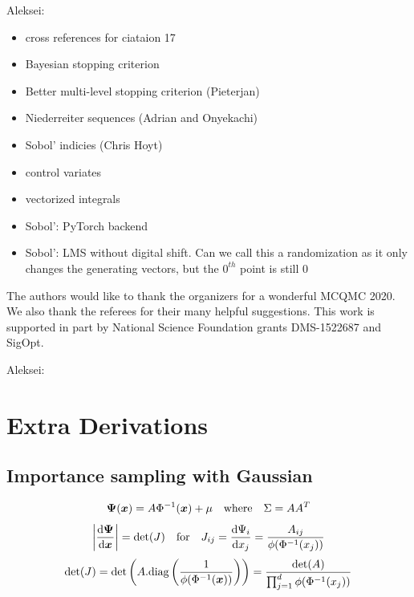 \documentclass[graybox,footinfo]{svmult}
\newcommand{\AGSComment}[1]{{\color{cyan} Aleksei: #1}}
\begin{document}
\AGSComment{
\begin{itemize}
    \item cross references for ciataion 17
    \item Bayesian stopping criterion
    \item Better multi-level stopping criterion (Pieterjan)
    \item Niederreiter sequences (Adrian and Onyekachi)
    \item Sobol' indicies (Chris Hoyt)
    \item control variates
    \item vectorized integrals
    \item Sobol': PyTorch  backend
    \item Sobol': LMS without digital shift. Can we call this a randomization as it only changes the generating vectors, but the $0^{th}$ point is still $0$
\end{itemize}}

\begin{acknowledgement}
The authors would like to thank the organizers for a wonderful MCQMC 2020. 
We also thank the referees for their many helpful suggestions.  This work is supported in part by National Science Foundation grants DMS-1522687 and SigOpt.
\end{acknowledgement}





\iffalse
\AGSComment{

\section{Extra Derivations}

\subsection{Importance sampling with Gaussian}

$$ {\boldsymbol{\Psi}}({\boldsymbol{x}}) = A\Phi^{-1}({\boldsymbol{x}}) + \mu \quad \text{where} \quad \Sigma = AA^T$$
$$ \left\lvert \frac{\mathrm{d} {\boldsymbol{\Psi}}}{\mathrm{d} {\boldsymbol{x}}} \right\rvert = \det(J) \quad \text{for} \quad J_{ij} = \frac{\mathrm{d} \Psi_i}{\mathrm{d} x_j} = \frac{A_{ij}}{\phi(\Phi^{-1}(x_j))}$$
$$ \det(J) = \det\left(A . \text{diag}\left(\frac{1}{\phi(\Phi^{-1}({\boldsymbol{x}}))}\right)\right) = \frac{\det(A)}{\prod_{j=1}^d \phi(\Phi^{-1}(x_j))}$$}
\end{document}
